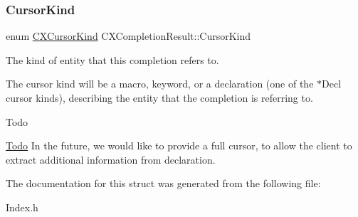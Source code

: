 \subsubsection{\texorpdfstring{Cursor\+Kind}{CursorKind}}
{\footnotesize\ttfamily enum \hyperlink{group__CINDEX_gaaccc432245b4cd9f2d470913f9ef0013}{C\+X\+Cursor\+Kind} C\+X\+Completion\+Result\+::\+Cursor\+Kind}



The kind of entity that this completion refers to. 

The cursor kind will be a macro, keyword, or a declaration (one of the $\ast$\+Decl cursor kinds), describing the entity that the completion is referring to.

\begin{DoxyRefDesc}{Todo}
\item[\hyperlink{todo__todo000001}{Todo}]In the future, we would like to provide a full cursor, to allow the client to extract additional information from declaration. \end{DoxyRefDesc}


The documentation for this struct was generated from the following file\+:\begin{DoxyCompactItemize}
\item 
Index.\+h\end{DoxyCompactItemize}
